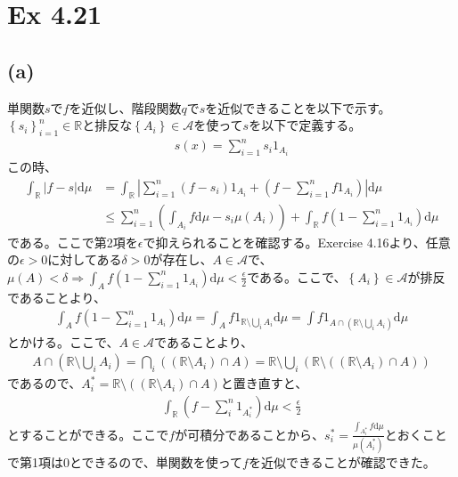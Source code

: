 \documentclass{article}
\begin{document}
\section{Ex 4.21}
\subsection{(a)}
単関数$s$で$f$を近似し、階段関数$q$で$s$を近似できることを以下で示す。$\left\{ s_i \right\}_{i = 1}^n \in \mathbb{R}$と排反な$\left\{ A_i \right\} \in \mathcal{A}$を使って$s$を以下で定義する。
\begin{align*}
	s(x) = \sum_{i = 1}^n s_i 1_{A_i}
\end{align*}
この時、
\begin{align*}
	\int_{\mathbb{R}} |f-s| \mathrm{d}\mu &= \int_{\mathbb{R}}\left| \sum_{i = 1}^n (f-s_i)1_{A_i} + \left(f- \sum_{i = 1}^n f1_{A_i} \right) \right| \mathrm{d}\mu\\
	&\leq \sum_{i = 1}^n \left( \int_{A_i} f\mathrm{d}\mu - s_i \mu(A_i) \right) + \int_{\mathbb{R}} f\left( 1 - \sum_{i=1}^n 1_{A_i} \right) \mathrm{d}\mu
\end{align*}
である。ここで第2項を$\epsilon$で抑えられることを確認する。Exercise 4.16より、任意の$\epsilon > 0$に対してある$\delta > 0$が存在し、$A\in \mathcal{A}$で、$\mu(A) < \delta \Rightarrow \int_A f \left( 1 - \sum_{i=1}^n 1_{A_i} \right) \mathrm{d}\mu < \frac{\epsilon}{2}$である。ここで、$\left\{ A_i \right\} \in \mathcal{A}$が排反であることより、
\begin{align*}
	\int_A f \left( 1 - \sum_{i=1}^n 1_{A_i} \right) \mathrm{d}\mu = \int_A f1_{\mathbb{R}\setminus \bigcup_i A_i} \mathrm{d}\mu = \int f1_{A \cap \left( \mathbb{R}\setminus \bigcup_i A_i \right)} \mathrm{d}\mu
\end{align*}
とかける。ここで、$A \in \mathcal{A}$であることより、
\begin{align*}
	A \cap \left( \mathbb{R}\setminus \bigcup_i A_i \right) = \bigcap_i \left( (\mathbb{R} \setminus A_i) \cap A \right) = \mathbb{R} \setminus \bigcup_i \left( \mathbb{R}\setminus \left( (\mathbb{R} \setminus A_i) \cap A \right) \right)
\end{align*}
であるので、$A_i^{*} = \mathbb{R}\setminus \left( (\mathbb{R} \setminus A_i) \cap A \right)$と置き直すと、
\begin{align*}
	\int_{\mathbb{R}} \left( f - \sum_i^n 1_{A_i^{*}} \right) \mathrm{d}\mu < \frac{\epsilon}{2}
\end{align*}
とすることができる。ここで$f$が可積分であることから、$s_i^{*} = \frac{\int_{A_i^{*}} f\mathrm{d}\mu}{\mu(A_i^{*})}$とおくことで第1項は$0$とできるので、単関数を使って$f$を近似できることが確認できた。
\end{document}
